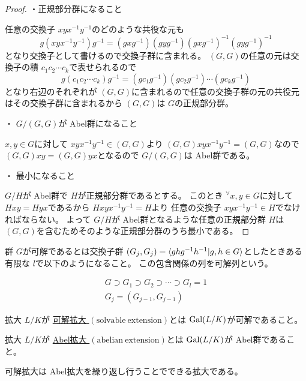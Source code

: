 \documentclass[../master_galois_theory]{subfiles}
\begin{document}
\begin{proof}
  ・正規部分群になること

  任意の交換子 $xyx^{-1}y^{-1}$のどのような共役な元も
  \[
  g(xyx^{-1}y^{-1})g^{-1} = (gxg^{-1})(gyg^{-1})(gxg^{-1})^{-1}(gyg^{-1})^{-1}
  \]
  となり交換子として書けるので交換子群に含まれる。
  $(G,G)$の任意の元は交換子の積 $c_1 c_2 \cdots c_k$で表せられるので
  \[
  g(c_1c_2 \cdots c_k)g^{-1} = (gc_1g^{-1}) (gc_2g^{-1}) \cdots (gc_kg^{-1})
  \]
  となり右辺のそれぞれが $(G,G)$に含まれるので任意の交換子群の元の共役元はその交換子群に含まれるから $(G,G)$は $G$の正規部分群。

  ・ $G/(G,G)$が Abel群になること

  $x,y \in G$に対して $xyx^{-1}y^{-1} \in (G,G)$より $(G,G)xyx^{-1}y^{-1} = (G,G)$なので $(G,G)xy = (G,G)yx$となるので $G/(G,G)$は Abel群である。

  ・ 最小になること

  $G/H$が Abel群で $H$が正規部分群であるとする。
  このとき ${}^\forall x,y \in G$に対して $Hxy = Hyx$であるから $Hxyx^{-1}y^{-1} = H$より
  任意の交換子 $xyx^{-1}y^{-1} \in H$でなければならない。
  よって $G/H$が Abel群となるような任意の正規部分群 $H$は $(G,G)$を含むためそのような正規部分群のうち最小である。

\end{proof}

\begin{defi}
  群 $G$が可解であるとは交換子群 $(G_j,G_j) = \braket{ghg^{-1}h^{-1} | g,h \in G}$としたときある有限な $l$で以下のようになること。
  この包含関係の列を可解列という。

  \begin{eqnarray*}
    G \supset G_1 \supset G_2 \supset \cdots \supset G_l = 1 \\
    G_j = (G_{j-1},G_{j-1})
  \end{eqnarray*}
\end{defi}

\begin{defi}
  \galois 拡大 $L/K$が \underline{可解拡大 $(\mathrm{solvable \  extension})$}とは $\mathrm{Gal}(L/K)$が可解であること。

  \galois 拡大 $L/K$が \underline{Abel拡大 $(\mathrm{abelian \  extension})$}とは $\mathrm{Gal}(L/K)$が Abel群であること。
\end{defi}

\begin{theo}
  可解拡大は \rm{Abel}拡大を繰り返し行うことでできる拡大である。
\end{theo}
\end{document}
